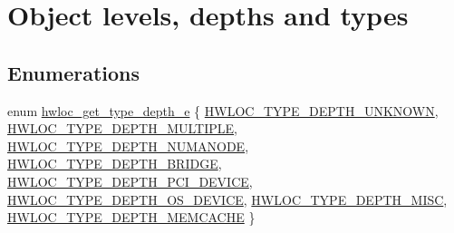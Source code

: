 \hypertarget{a00187}{}\section{Object levels, depths and types}
\label{a00187}
\subsection*{Enumerations}
\begin{DoxyCompactItemize}
\item 
enum \hyperlink{a00187_gaf4e663cf42bbe20756b849c6293ef575}{hwloc\+\_\+get\+\_\+type\+\_\+depth\+\_\+e} \{ \newline
\hyperlink{a00187_ggaf4e663cf42bbe20756b849c6293ef575a0565ab92ab72cb0cec91e23003294aad}{H\+W\+L\+O\+C\+\_\+\+T\+Y\+P\+E\+\_\+\+D\+E\+P\+T\+H\+\_\+\+U\+N\+K\+N\+O\+WN}, 
\hyperlink{a00187_ggaf4e663cf42bbe20756b849c6293ef575ae99465995cacde6c210d5fc2e409798c}{H\+W\+L\+O\+C\+\_\+\+T\+Y\+P\+E\+\_\+\+D\+E\+P\+T\+H\+\_\+\+M\+U\+L\+T\+I\+P\+LE}, 
\hyperlink{a00187_ggaf4e663cf42bbe20756b849c6293ef575a245c34ec9884c2cf5de5049b2153ed9c}{H\+W\+L\+O\+C\+\_\+\+T\+Y\+P\+E\+\_\+\+D\+E\+P\+T\+H\+\_\+\+N\+U\+M\+A\+N\+O\+DE}, 
\hyperlink{a00187_ggaf4e663cf42bbe20756b849c6293ef575af93b50182973e4a718d9d4db9e253a90}{H\+W\+L\+O\+C\+\_\+\+T\+Y\+P\+E\+\_\+\+D\+E\+P\+T\+H\+\_\+\+B\+R\+I\+D\+GE}, 
\newline
\hyperlink{a00187_ggaf4e663cf42bbe20756b849c6293ef575ad8b1516e699b57ce1c8d107fbd2f674c}{H\+W\+L\+O\+C\+\_\+\+T\+Y\+P\+E\+\_\+\+D\+E\+P\+T\+H\+\_\+\+P\+C\+I\+\_\+\+D\+E\+V\+I\+CE}, 
\hyperlink{a00187_ggaf4e663cf42bbe20756b849c6293ef575afe9a2131073eebbe129d4aa2928d3f46}{H\+W\+L\+O\+C\+\_\+\+T\+Y\+P\+E\+\_\+\+D\+E\+P\+T\+H\+\_\+\+O\+S\+\_\+\+D\+E\+V\+I\+CE}, 
\hyperlink{a00187_ggaf4e663cf42bbe20756b849c6293ef575a96436a392b4cdcaa1a29bc65351b373f}{H\+W\+L\+O\+C\+\_\+\+T\+Y\+P\+E\+\_\+\+D\+E\+P\+T\+H\+\_\+\+M\+I\+SC}, 
\hyperlink{a00187_ggaf4e663cf42bbe20756b849c6293ef575a8b8d7d300c018c0eb65e6c9a9f162101}{H\+W\+L\+O\+C\+\_\+\+T\+Y\+P\+E\+\_\+\+D\+E\+P\+T\+H\+\_\+\+M\+E\+M\+C\+A\+C\+HE}
 \}
\end{DoxyCompactItemize}
